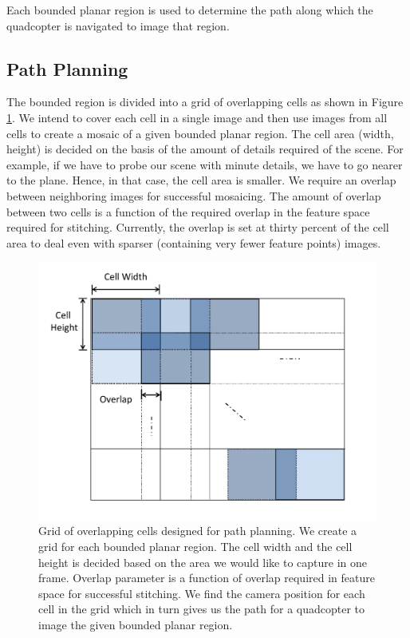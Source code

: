 Each bounded planar region is used to determine the path along which
the quadcopter is navigated to image that region.

\subsection{Path Planning}
The bounded region is divided into a grid of overlapping cells as shown in
Figure \ref{fig:grid}. We intend to cover each cell in a single image and then
use images from all cells to create a mosaic of a given bounded planar
region. The cell area (width, height) is decided on the basis of the amount of
details required of the scene. For example, if we have to probe our scene with
minute details, we have to go nearer to the plane. Hence, in that case, the
cell area is smaller. We require an overlap between neighboring images for
successful mosaicing. The amount of overlap between two cells is a function of
the required overlap in the feature space required for stitching. Currently,
the overlap is set at thirty percent of the cell area to deal even with sparser
(containing very fewer feature points) images.

\begin{figure}[h!]
\centering
\includegraphics[width=\linewidth]{figures/multiplanar/PathPlanningGrid}
\caption{Grid of overlapping cells designed for path planning. We create a
grid for each bounded planar region. The cell width and the cell height is
decided based on the area we would like to capture in one frame. Overlap parameter is
a function of overlap required in feature space for successful stitching.
We find the camera position for each cell in the grid which in turn
gives us the path for a quadcopter to image the given bounded planar region.}
\label{fig:grid}
\end{figure}

